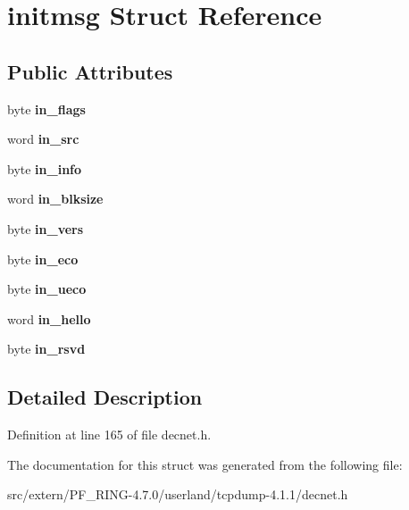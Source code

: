 \hypertarget{structinitmsg}{
\section{initmsg Struct Reference}
\label{structinitmsg}
}
\subsection*{Public Attributes}
\begin{DoxyCompactItemize}
\item 
\hypertarget{structinitmsg_a19e59d0008efd670f0690fba11984884}{
byte {\bfseries in\_\-flags}}
\label{structinitmsg_a19e59d0008efd670f0690fba11984884}

\item 
\hypertarget{structinitmsg_a723efbd4aecf42d5eff99bb55b170d7b}{
word {\bfseries in\_\-src}}
\label{structinitmsg_a723efbd4aecf42d5eff99bb55b170d7b}

\item 
\hypertarget{structinitmsg_a7b7bc1cf521ac8b593773b1ba710661d}{
byte {\bfseries in\_\-info}}
\label{structinitmsg_a7b7bc1cf521ac8b593773b1ba710661d}

\item 
\hypertarget{structinitmsg_a30a1b93c7516b4f8af3b1501b2978ec9}{
word {\bfseries in\_\-blksize}}
\label{structinitmsg_a30a1b93c7516b4f8af3b1501b2978ec9}

\item 
\hypertarget{structinitmsg_acb38179c86a5fba4ab65c55c755410c0}{
byte {\bfseries in\_\-vers}}
\label{structinitmsg_acb38179c86a5fba4ab65c55c755410c0}

\item 
\hypertarget{structinitmsg_a12ae195439783000a60845a36471ca25}{
byte {\bfseries in\_\-eco}}
\label{structinitmsg_a12ae195439783000a60845a36471ca25}

\item 
\hypertarget{structinitmsg_a4449547dbea6156280702c1f5d449d49}{
byte {\bfseries in\_\-ueco}}
\label{structinitmsg_a4449547dbea6156280702c1f5d449d49}

\item 
\hypertarget{structinitmsg_a85e15331039eef5b0281dc0465187368}{
word {\bfseries in\_\-hello}}
\label{structinitmsg_a85e15331039eef5b0281dc0465187368}

\item 
\hypertarget{structinitmsg_af7f44c8789831d89f5f86fc9e756e0d8}{
byte {\bfseries in\_\-rsvd}}
\label{structinitmsg_af7f44c8789831d89f5f86fc9e756e0d8}

\end{DoxyCompactItemize}


\subsection{Detailed Description}


Definition at line 165 of file decnet.h.



The documentation for this struct was generated from the following file:\begin{DoxyCompactItemize}
\item 
src/extern/PF\_\-RING-\/4.7.0/userland/tcpdump-\/4.1.1/decnet.h\end{DoxyCompactItemize}
